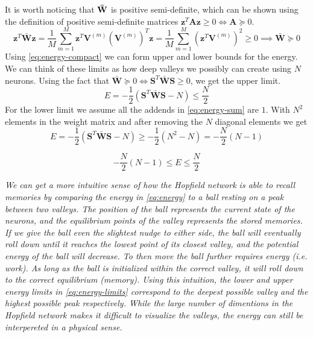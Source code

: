 It is worth noticing that $\bf \bar{W}$ is positive semi-definite, which can be shown using the definition of positive semi-definite matrices $\mathbf{z}^T \mathbf{A} \mathbf{z} \geq 0 \iff \mathbf{A} \succeq 0$.
\begin{equation*}
\mathbf{z}^T\bar{\mathbf{W}} \mathbf{z} = \frac{1}{M}\sum_{m=1}^M \mathbf{z}^T \mathbf{V}^{(m)}(\mathbf{V}^{(m)})^T \mathbf{z} = \frac{1}{M}\sum_{m=1}^M (\mathbf{z}^T \mathbf{V}^{(m)})^2 \geq 0 \implies \mathbf{\bar{W}} \succeq 0
\end{equation*}
Using \cref{eq:energy-compact} we can form upper and lower bounds for the energy. We can think of these limits as how deep valleys we possibly can create using $N$ neurons. Using the fact that $\mathbf{\bar{W}} \succeq 0 \iff \mathbf{S}^T \mathbf{\bar{W}}\mathbf{S} \geq 0$, we get the upper limit.
\begin{equation*}
    E = -\frac{1}{2}(\mathbf{S}^T \bar{\mathbf{W}} \mathbf{S} - N) \leq \frac{N}{2}
\end{equation*}
For the lower limit we assume all the addends in \cref{eq:energy-sum} are $1$. With $N^2$ elements in the weight matrix and after removing the $N$ diagonal elements we get
\begin{equation*}
    E = -\frac{1}{2}(\mathbf{S}^T \bar{\mathbf{W}} \mathbf{S} - N) \geq -\frac{1}{2} (N^2 - N) = -\frac{N}{2} (N-1) 
\end{equation*}

\begin{tcolorbox}[title={Energy Limits}]
    \begin{equation}\label{eq:energy-limits}
        -\frac{N}{2}(N-1) \leq E \leq \frac{N}{2}
    \end{equation}
\end{tcolorbox}

\begin{tcolorbox}[title={Intution behind the energy}]
    \textit{We can get a more intuitive sense of how the Hopfield network is able to recall memories by comparing the energy in \cref{eq:energy} to a ball resting on a peak between two valleys. The position of the ball represents the current state of the neurons, and the equilibrium points of the valley represents the stored memories. If we give the ball even the slightest nudge to either side, the ball will eventually roll down until it reaches the lowest point of its closest valley, and the potential energy of the ball will decrease. To then move the ball further requires energy (i.e. work). As long as the ball is initialized within the correct valley, it will roll down to the correct equilibrium (memory). Using this intuition, the lower and upper energy limits in \cref{eq:energy-limits} correspond to the deepest possible valley and the highest possible peak respectively. While the large number of dimentions in the Hopfield network makes it difficult to visualize the valleys, the energy can still be interpereted in a physical sense.}
\end{tcolorbox}




